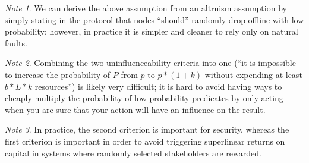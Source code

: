 \documentclass[11pt,a4paper]{report}
\theoremstyle{plain}
\theoremstyle{definition}
\theoremstyle{remark}
\newtheorem*{note}{Note}
\begin{document}
\begin{note}
We can derive the above assumption from an altruism assumption by simply stating in the protocol that nodes ``should'' randomly drop offline with low probability; however, in practice it is simpler and cleaner to rely only on natural faults.
\end{note}

\begin{note}
Combining the two uninfluenceability criteria into one (``it is impossible to increase the probability of $P$ from $p$ to $p * (1 + k)$ without expending at least $b * L * k$ resources'') is likely very difficult; it is hard to avoid having ways to cheaply multiply the probability of low-probability predicates by only acting when you are sure that your action will have an influence on the result. 
\end{note}

\begin{note}
In practice, the second criterion is important for security, whereas the first criterion is important in order to avoid triggering superlinear returns on capital in systems where randomly selected stakeholders are rewarded.
\end{note}
\end{document}

